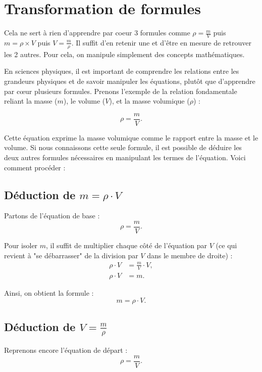 \documentclass[a4paper,12pt]{article}
\begin{document}
\section{Transformation de formules}

\begin{tcolorbox}[colback=red!10!white, colframe=red!75!black, title=PAR COEUR]
  Cela ne sert à rien d'apprendre par coeur 3 formules comme \(\rho = \frac{m}{V}\) puis \(m = \rho \times V\) puis \(V = \frac{m}{\rho}\). Il suffit d'en retenir une et d'être en mesure de retrouver les 2 autres. Pour cela, on manipule simplement des concepts mathématiques.
\end{tcolorbox}

En sciences physiques, il est important de comprendre les relations entre les grandeurs physiques et de savoir manipuler les équations, plutôt que d'apprendre par cœur plusieurs formules. Prenons l'exemple de la relation fondamentale reliant la masse ($m$), le volume ($V$), et la masse volumique ($\rho$) :

\begin{equation}
\rho = \frac{m}{V}.
\end{equation}

Cette équation exprime la masse volumique comme le rapport entre la masse et le volume. Si nous connaissons cette seule formule, il est possible de déduire les deux autres formules nécessaires en manipulant les termes de l'équation. Voici comment procéder :

\subsection*{Déduction de $m = \rho \cdot V$}
Partons de l'équation de base :
\begin{equation}
\rho = \frac{m}{V}.
\end{equation}

Pour isoler $m$, il suffit de multiplier chaque côté de l'équation par $V$ (ce qui revient à "se débarrasser" de la division par $V$ dans le membre de droite) :
\begin{align}
\rho \cdot V &= \frac{m}{V} \cdot V, \\
\rho \cdot V &= m.
\end{align}

Ainsi, on obtient la formule :
\begin{equation}
m = \rho \cdot V.
\end{equation}

\subsection*{Déduction de $V = \frac{m}{\rho}$}
Reprenons encore l'équation de départ :
\begin{equation}
\rho = \frac{m}{V}.
\end{equation}
\end{document}
